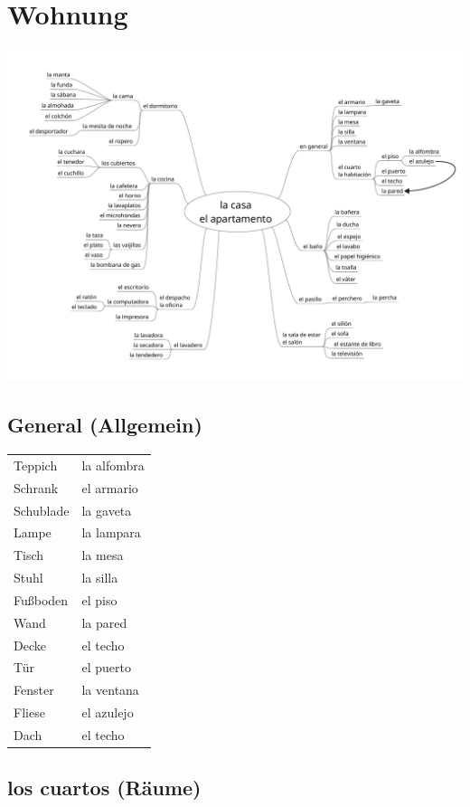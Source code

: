 \documentclass{spanish_summary}
\begin{document}
\chapter*{Wohnung}
\begin{center}
  \includegraphics[scale=0.7]{casa.pdf}
\end{center}

\section*{General (Allgemein)}
\begin{longtable}{p{} p{}} 
  Teppich & la alfombra \\
  Schrank & el armario\\
  Schublade & la gaveta\\
  Lampe & la lampara\\
  Tisch & la mesa\\
  Stuhl & la silla\\
  Fußboden & el piso\\
  Wand & la pared\\
  Decke & el techo\\
  Tür & el puerto\\
  Fenster & la ventana\\
  Fliese & el azulejo\\
  Dach & el techo
\end{longtable}

\section*{los cuartos (Räume)}
\end{document}
